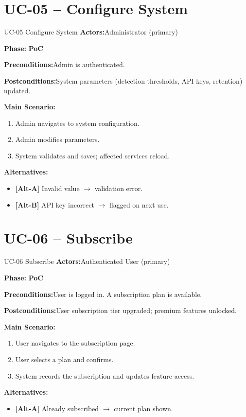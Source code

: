 \documentclass[12pt,a4paper]{report}
\newcommand{\ucfield}[2]{%
    \noindent\textbf{\color{helixpurplemid}#1:}\quad #2\par\medskip
}
\newcommand{\ucphase}[1]{%
    \noindent\textbf{\color{helixpurplemid}Phase:}\quad%
    \ifstrequal{#1}{PoC}{\textcolor{helixteal}{\textbf{PoC}}}{\textcolor{helixamber}{\textbf{Future MVP}}}%
    \par\medskip
}
\begin{document}
\section{UC-05 -- Configure System}
\begin{ucbox}{UC-05 \quad Configure System}
    \ucfield{Actors}{Administrator (primary)}
    \ucphase{PoC}
    \ucfield{Preconditions}{Admin is authenticated.}
    \ucfield{Postconditions}{System parameters (detection thresholds, API keys, retention) updated.}
    \textbf{\color{helixpurplemid}Main Scenario:}
    \begin{enumerate}
        \item Admin navigates to system configuration.
        \item Admin modifies parameters.
        \item System validates and saves; affected services reload.
    \end{enumerate}
    \textbf{\color{helixpurplemid}Alternatives:}
    \begin{itemize}
        \item \textbf{[Alt-A]} Invalid value $\rightarrow$ validation error.
        \item \textbf{[Alt-B]} API key incorrect $\rightarrow$ flagged on next use.
    \end{itemize}
\end{ucbox}

\section{UC-06 -- Subscribe}
\begin{ucbox}{UC-06 \quad Subscribe}
    \ucfield{Actors}{Authenticated User (primary)}
    \ucphase{PoC}
    \ucfield{Preconditions}{User is logged in. A subscription plan is available.}
    \ucfield{Postconditions}{User subscription tier upgraded; premium features unlocked.}
    \textbf{\color{helixpurplemid}Main Scenario:}
    \begin{enumerate}
        \item User navigates to the subscription page.
        \item User selects a plan and confirms.
        \item System records the subscription and updates feature access.
    \end{enumerate}
    \textbf{\color{helixpurplemid}Alternatives:}
    \begin{itemize}
        \item \textbf{[Alt-A]} Already subscribed $\rightarrow$ current plan shown.
    \end{itemize}
\end{ucbox}
\end{document}
